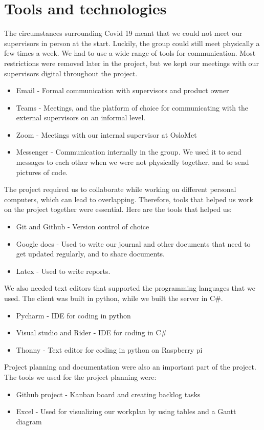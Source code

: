 \section{Tools and technologies}
The circumstances surrounding Covid 19 meant that we could not meet our supervisors in person at the start. Luckily, the group could still meet physically a few times a week. We had to use a wide range of tools for communication. Most restrictions were removed later in the project, but we kept our meetings with our supervisors digital throughout the project. 

\begin{itemize}
	\item Email - Formal communication with supervisors and product owner
	\item Teams - Meetings, and the platform of choice for communicating with the external supervisors on an informal level. 
	\item Zoom - Meetings with our internal supervisor at OsloMet
	\item Messenger - Communication internally in the group. We used it to send messages to each other when we were not physically together, and to send pictures of code. 
\end{itemize}

The project required us to collaborate while working on different personal computers, which can lead to overlapping. Therefore, tools that helped us work on the project together were essential. Here are the tools that helped us:

\begin{itemize}
	\item Git and Github - Version control of choice
	\item Google docs - Used to write our journal and other documents that need to get updated regularly, and to share documents. 
	\item Latex - Used to write reports.
\end{itemize}

We also needed text editors that supported the programming languages that we used. The client was built in python, while we built the server in C\#. 

\begin{itemize}
	\item Pycharm - IDE for coding in python
	\item Visual studio and Rider - IDE for coding in C\#
	\item Thonny - Text editor for coding in python on Raspberry pi
\end{itemize}

Project planning and documentation were also an important part of the project. The tools we used for the project planning were:

\begin{itemize}
	\item Github project - Kanban board and creating backlog tasks
	\item Excel - Used for visualizing our workplan by using tables and a Gantt diagram
\end{itemize}